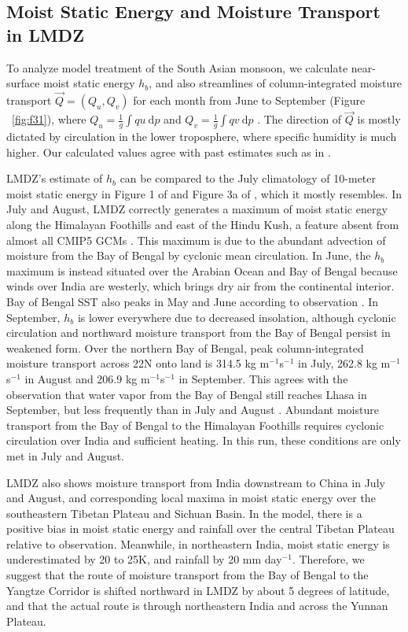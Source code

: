 \subsection{Moist Static Energy and Moisture Transport in LMDZ}
	
	To analyze model treatment of the South Asian monsoon, we calculate near-surface moist static energy $h_b$, and also streamlines of column-integrated moisture transport $\vec{Q}=(Q_u,Q_v)$ for each month from June to September (Figure ~\ref{fig:f31}), where $Q_u=\frac{1}{g}\int qu\ \mathrm{d}p$ and $Q_v= \frac{1}{g}\int qv\ \mathrm{d}p$ \citep{Trenberth1991}. The direction of $\vec{Q}$ is mostly dictated by circulation in the lower troposphere, where specific humidity is much higher. Our calculated values agree with past estimates such as in \cite{Feng2012}. 
	
	LMDZ's estimate of $h_b$ can be compared to the July climatology of 10-meter moist static energy in Figure 1 of \cite{Nie2010} and Figure 3a of \cite{Boos2013a}, which it mostly resembles. In July and August, LMDZ correctly generates a maximum of moist static energy along the Himalayan Foothills and east of the Hindu Kush, a feature absent from almost all CMIP5 GCMs \citep{Boos2013a}. This maximum is due to the abundant advection of moisture from the Bay of Bengal by cyclonic mean circulation. In June, the $h_b$ maximum is instead situated over the Arabian Ocean and Bay of Bengal because winds over India are westerly, which brings dry air from the continental interior. Bay of Bengal SST also peaks in May and June according to observation \citep{Bhat2004}. In September, $h_b$ is lower everywhere due to decreased insolation, although cyclonic circulation and northward moisture transport from the Bay of Bengal persist in weakened form. Over the northern Bay of Bengal, peak column-integrated moisture transport across 22\textdegree N onto land is 314.5 kg m$^{-1}$s$^{-1}$ in July, 262.8 kg m$^{-1}$s$^{-1}$ in August and 206.9 kg m$^{-1}$s$^{-1}$ in September. This agrees with the observation that water vapor from the Bay of Bengal still reaches Lhasa in September, but less frequently than in July and August \citep{Gao2011}. Abundant moisture transport from the Bay of Bengal to the Himalayan Foothills requires cyclonic circulation over India and sufficient heating. In this run, these conditions are only met in July and August.
	
	LMDZ also shows moisture transport from India downstream to China in July and August, and corresponding local maxima in moist static energy over the southeastern Tibetan Plateau and Sichuan Basin. In the model, there is a positive bias in moist static energy and rainfall over the central Tibetan Plateau relative to observation. Meanwhile, in northeastern India, moist static energy is underestimated by 20 to 25K, and rainfall by 20 mm day$^{-1}$. Therefore, we suggest that the route of moisture transport from the Bay of Bengal to the Yangtze Corridor is shifted northward in LMDZ by about 5 degrees of latitude, and that the actual route is through northeastern India and across the Yunnan Plateau.

